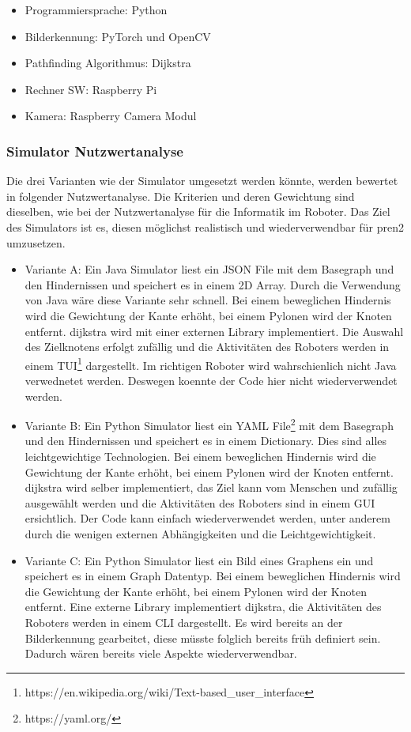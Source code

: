 \begin{itemize}
    \item Programmiersprache: Python
    \item Bilderkennung: PyTorch und OpenCV
    \item Pathfinding Algorithmus: Dijkstra
    \item Rechner SW: Raspberry Pi
    \item Kamera: Raspberry Camera Modul
\end{itemize}

\subsubsection*{Simulator Nutzwertanalyse}


Die drei Varianten wie der Simulator umgesetzt werden könnte, werden bewertet in folgender Nutzwertanalyse. Die Kriterien und deren Gewichtung sind dieselben, wie bei der Nutzwertanalyse für die Informatik im Roboter. Das Ziel des Simulators ist es, diesen möglichst realistisch und wiederverwendbar für \acrshort{pren2} umzusetzen.

\begin{itemize}
    \item Variante A: Ein Java Simulator liest ein JSON File mit dem Basegraph und den Hindernissen und speichert es in einem 2D Array. Durch die Verwendung von Java wäre diese Variante sehr schnell. Bei einem beweglichen Hindernis wird die Gewichtung der Kante erhöht, bei einem Pylonen wird der Knoten entfernt. \gls{dijkstra} wird mit einer externen Library implementiert. Die Auswahl des Zielknotens erfolgt zufällig und die Aktivitäten des Roboters werden in einem TUI\footnote{https://en.wikipedia.org/wiki/Text-based\_user\_interface} dargestellt. Im richtigen Roboter wird wahrschienlich nicht Java verwednetet werden. Deswegen koennte der Code hier nicht wiederverwendet werden.
    \item Variante B: Ein Python Simulator liest ein YAML File\footnote{https://yaml.org/} mit dem Basegraph und den Hindernissen und speichert es in einem Dictionary. Dies sind alles leichtgewichtige Technologien. Bei einem beweglichen Hindernis wird die Gewichtung der Kante erhöht, bei einem Pylonen wird der Knoten entfernt. \gls{dijkstra} wird selber implementiert, das Ziel kann vom Menschen und zufällig ausgewählt werden und die Aktivitäten des Roboters sind in einem GUI ersichtlich. Der Code kann einfach wiederverwendet werden, unter anderem durch die wenigen externen Abhängigkeiten und die Leichtgewichtigkeit. 
    \item Variante C: Ein Python Simulator liest ein Bild eines Graphens ein und speichert es in einem Graph Datentyp. Bei einem beweglichen Hindernis wird die Gewichtung der Kante erhöht, bei einem Pylonen wird der Knoten entfernt. Eine externe Library implementiert \gls{dijkstra}, die Aktivitäten des Roboters werden in einem CLI dargestellt. Es wird bereits an der Bilderkennung gearbeitet, diese müsste folglich bereits früh definiert sein. Dadurch wären bereits viele Aspekte wiederverwendbar.
\end{itemize}

